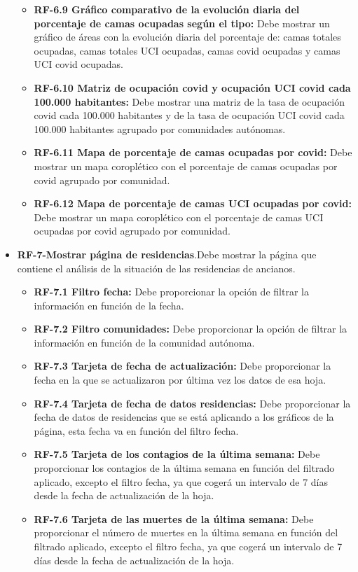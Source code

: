 \begin{itemize}
\begin{itemize}
            \item \textbf{RF-6.9 Gráfico comparativo de la evolución diaria del porcentaje de camas ocupadas según el tipo:} Debe mostrar un gráfico de áreas con la evolución diaria del porcentaje de: camas totales ocupadas, camas totales UCI ocupadas, camas covid ocupadas y camas UCI covid ocupadas.
            \item \textbf{RF-6.10 Matriz de ocupación covid y ocupación UCI covid cada 100.000 habitantes:} Debe mostrar una matriz de la tasa de ocupación covid cada 100.000 habitantes y de la tasa de ocupación UCI covid cada 100.000 habitantes agrupado por comunidades autónomas.
            \item \textbf{RF-6.11 Mapa de porcentaje de camas ocupadas por covid:} Debe mostrar un mapa coroplético con el porcentaje de camas ocupadas por covid agrupado por comunidad.
            \item \textbf{RF-6.12 Mapa de porcentaje de camas UCI ocupadas por covid:} Debe mostrar un mapa coroplético con el porcentaje de camas UCI ocupadas por covid agrupado por comunidad.
    \end{itemize} 
    \item \textbf{RF-7-Mostrar página de residencias}.Debe mostrar la página que contiene el análisis de la situación de las residencias de ancianos.
    \begin{itemize}
        \tightlist
            \item \textbf{RF-7.1 Filtro fecha:} Debe proporcionar la opción de filtrar la información en función de la fecha.
            \item \textbf{RF-7.2 Filtro comunidades:} Debe proporcionar la opción de filtrar la información en función de la comunidad autónoma.
            \item \textbf{RF-7.3 Tarjeta de fecha de actualización:} Debe proporcionar la fecha en la que se actualizaron por última vez los datos de esa hoja.
            \item \textbf{RF-7.4 Tarjeta de fecha de datos residencias:} Debe proporcionar la fecha de datos de residencias que se está aplicando a los gráficos de la página, esta fecha va en función del filtro fecha.
            \item \textbf{RF-7.5 Tarjeta de los contagios de la última semana:} Debe proporcionar los contagios de la última semana en función del filtrado aplicado, excepto el filtro fecha,  ya que cogerá un intervalo de 7 días desde la fecha de actualización de la hoja.
            \item \textbf{RF-7.6 Tarjeta de las muertes de la última semana:} Debe proporcionar el número de muertes en la última semana en función del filtrado aplicado, excepto el filtro fecha,  ya que cogerá un intervalo de 7 días desde la fecha de actualización de la hoja.

\end{itemize}
\end{itemize}
